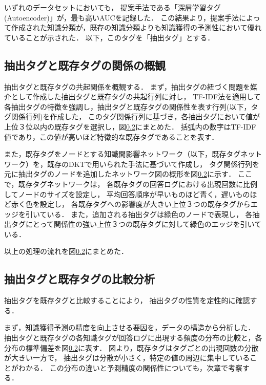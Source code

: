 いずれのデータセットにおいても，
提案手法である「深層学習タグ(Autoencoder)」が，最も高いAUCを記録した．
この結果より，提案手法によって作成された知識分類が，既存の知識分類よりも知識獲得の予測性において優れていることが示された．
以下，このタグを「抽出タグ」とする．


\subsection{抽出タグと既存タグの関係の概観}
抽出タグと既存タグの共起関係を概観する．
まず，抽出タグの紐づく問題を媒介として作成した抽出タグと既存タグの共起行列に対し，
TF-IDF法を適用して各抽出タグの特徴を強調し，抽出タグと既存タグの関係性を表す行列(以下，タグ関係行列)を作成した，
このタグ関係行列に基づき，各抽出タグにおいて値が上位３位以内の既存タグを選択し，図\ref{}にまとめた．
括弧内の数字はTF-IDF値であり，この値が高いほど特徴的な既存タグであることを表す．

また，既存タグをノードとする知識間影響ネットワーク（以下，既存タグネットワーク）を，既存のDKTで用いられた手法に基づいて作成し，
タグ関係行列を元に抽出タグのノードを追加したネットワーク図の概形を図\ref{}に示す．
ここで，既存タグネットワークは，
各既存タグの回答ログにおける出現回数に比例してノードのサイズを設定し，
平均回答順序が早いものほど青く，遅いものほど赤く色を設定し，
各既存タグへの影響度が大きい上位３つの既存タグからエッジを引いている．
また，追加される抽出タグは緑色のノードで表現し，
各抽出タグにとって関係性の強い上位３つの既存タグに対して緑色のエッジを引いている．

以上の処理の流れを図\ref{}にまとめた．


\subsection{抽出タグと既存タグの比較分析}
抽出タグを既存タグと比較することにより，
抽出タグの性質を定性的に確認する．

まず，知識獲得予測の精度を向上させる要因を，データの構造から分析した．
抽出タグと既存タグの各知識タグが回答ログに出現する頻度の分布の比較と，各分布の標準偏差を図\ref{}に表す．
図より，既存タグはタグごとの出現回数の分散が大きい一方で，
抽出タグは分散が小さく，特定の値の周辺に集中していることがわかる．
この分布の違いと予測精度の関係性についても，次章で考察する．

